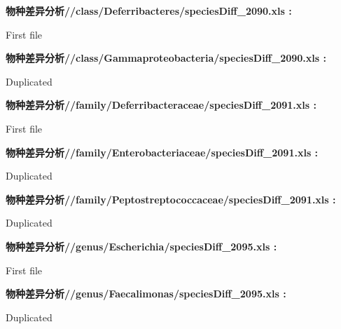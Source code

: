 \documentclass[
]{article}
\begin{document}
\begin{center}\begin{tcolorbox}[colback=gray!10, colframe=gray!50, width=0.9\linewidth, arc=1mm, boxrule=0.5pt]
\textbf{
物种差异分析//class/Deferribacteres/speciesDiff\_2090.xls
:}

\vspace{0.5em}

    First file

\vspace{2em}


\textbf{
物种差异分析//class/Gammaproteobacteria/speciesDiff\_2090.xls
:}

\vspace{0.5em}

    Duplicated

\vspace{2em}


\textbf{
物种差异分析//family/Deferribacteraceae/speciesDiff\_2091.xls
:}

\vspace{0.5em}

    First file

\vspace{2em}


\textbf{
物种差异分析//family/Enterobacteriaceae/speciesDiff\_2091.xls
:}

\vspace{0.5em}

    Duplicated

\vspace{2em}


\textbf{
物种差异分析//family/Peptostreptococcaceae/speciesDiff\_2091.xls
:}

\vspace{0.5em}

    Duplicated

\vspace{2em}


\textbf{
物种差异分析//genus/Escherichia/speciesDiff\_2095.xls
:}

\vspace{0.5em}

    First file

\vspace{2em}


\textbf{
物种差异分析//genus/Faecalimonas/speciesDiff\_2095.xls
:}

\vspace{0.5em}

    Duplicated


\end{tcolorbox}
\end{center}
\end{document}
